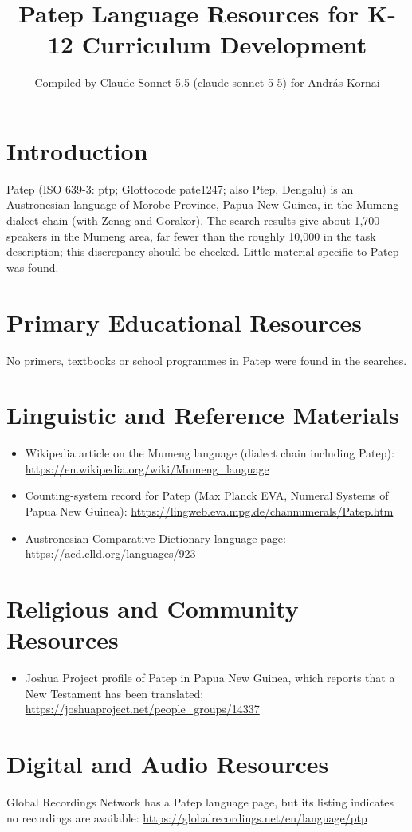 \documentclass[12pt]{article}
\title{Patep Language Resources for K-12 Curriculum Development}
\author{Compiled by Claude Sonnet 5.5 (claude-sonnet-5-5) for Andr\'as Kornai}
\date{}
\begin{document}
\maketitle

\section{Introduction}
Patep (ISO 639-3: ptp; Glottocode pate1247; also Ptep, Dengalu) is an Austronesian language of Morobe Province, Papua New Guinea, in the Mumeng dialect chain (with Zenag and Gorakor). The search results give about 1,700 speakers in the Mumeng area, far fewer than the roughly 10,000 in the task description; this discrepancy should be checked. Little material specific to Patep was found.

\section{Primary Educational Resources}
No primers, textbooks or school programmes in Patep were found in the searches.

\section{Linguistic and Reference Materials}
\begin{itemize}
\item Wikipedia article on the Mumeng language (dialect chain including Patep): \url{https://en.wikipedia.org/wiki/Mumeng_language}
\item Counting-system record for Patep (Max Planck EVA, Numeral Systems of Papua New Guinea): \url{https://lingweb.eva.mpg.de/channumerals/Patep.htm}
\item Austronesian Comparative Dictionary language page: \url{https://acd.clld.org/languages/923}
\end{itemize}

\section{Religious and Community Resources}
\begin{itemize}
\item Joshua Project profile of Patep in Papua New Guinea, which reports that a New Testament has been translated: \url{https://joshuaproject.net/people_groups/14337}
\end{itemize}

\section{Digital and Audio Resources}
Global Recordings Network has a Patep language page, but its listing indicates no recordings are available: \url{https://globalrecordings.net/en/language/ptp}
\end{document}
